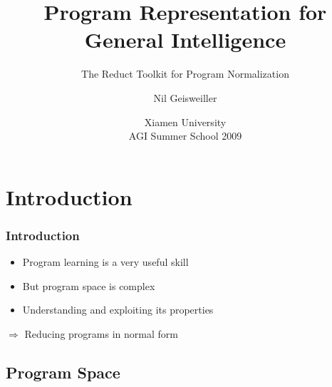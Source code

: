 \documentclass{beamer}
\title{Program Representation for General Intelligence}
\subtitle{The Reduct Toolkit for Program Normalization}
\author{Nil Geisweiller}
\institute[Xiamen University] %
{
  Novamente LLC
}
\date[Xiamen University AGI Summer School 2009] %
{Xiamen University\\ AGI Summer School 2009}
\begin{document}
\frame
{
  \maketitle
}
\section[Outline]{}
\frame{\tableofcontents}

\section{Introduction}

\frame
{

  \frametitle{Introduction}
  
  \begin{itemize}
  \item \alert{Program learning} is a very useful skill
  \item But program space is \alert{complex}    
  \item Understanding and \alert{exploiting its properties}
  \end{itemize}

  $\Rightarrow$ \alert{Reducing programs in normal form}
}

\subsection{Program Space}
\end{document}
